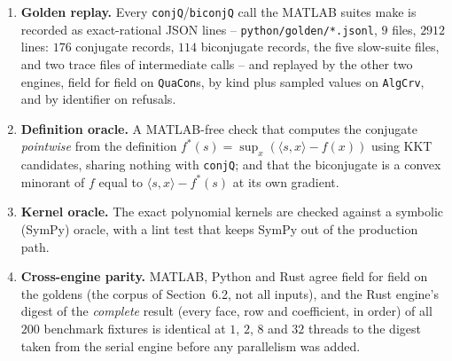 \documentclass[11pt]{article}
\theoremstyle{definition}
\begin{document}
\begin{enumerate}[label=\textbf{(\arabic*)},leftmargin=*]
\item \textbf{Golden replay.} Every \texttt{conjQ}/\texttt{biconjQ} call the
  MATLAB suites make is recorded as exact-rational JSON lines --
  \texttt{python/golden/*.jsonl}, $9$ files, $2912$ lines: $176$ conjugate
  records, $114$ biconjugate records, the five slow-suite files, and two
  trace files of intermediate calls -- and replayed by the other two engines,
  field for field on \texttt{QuaCon}s, by kind plus sampled values on
  \texttt{AlgCrv}, and by identifier on refusals.
\item \textbf{Definition oracle.} A MATLAB-free check that computes the
  conjugate \emph{pointwise} from the definition
  $f^*(s)=\sup_x(\langle s,x\rangle-f(x))$ using KKT candidates, sharing
  nothing with \texttt{conjQ}; and that the biconjugate is a convex minorant
  of $f$ equal to $\langle s,x\rangle-f^*(s)$ at its own gradient.
\item \textbf{Kernel oracle.} The exact polynomial kernels are checked against
  a symbolic (SymPy) oracle, with a lint test that keeps SymPy out of the
  production path.
\item \textbf{Cross-engine parity.} MATLAB, Python and Rust agree field for
  field on the goldens (the corpus of Section~6.2, not all inputs), and the Rust engine's digest of the \emph{complete}
  result (every face, row and coefficient, in order) of all $200$ benchmark
  fixtures is identical at $1$, $2$, $8$ and $32$ threads to the digest taken
  from the serial engine before any parallelism was added.
\end{enumerate}
\end{document}
